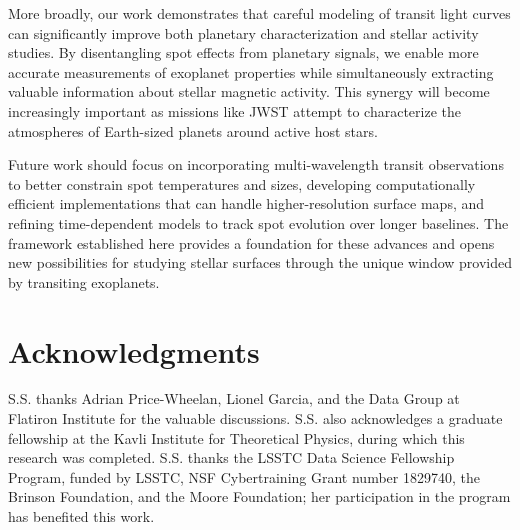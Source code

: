 \documentclass[twocolumn]{aastex631}
\begin{document}
More broadly, our work demonstrates that careful modeling of transit light curves can significantly improve both planetary characterization and stellar activity studies. 
By disentangling spot effects from planetary signals, we enable more accurate measurements of exoplanet properties while simultaneously extracting valuable information about stellar magnetic 
activity. This synergy will become increasingly important as missions like JWST attempt to characterize the atmospheres of Earth-sized planets around active host stars.

Future work should focus on incorporating multi-wavelength transit observations to better constrain spot temperatures and sizes, developing computationally efficient 
implementations that can handle higher-resolution surface maps, and refining time-dependent models to track spot evolution over longer baselines. 
The framework established here provides a foundation for these advances and opens new possibilities for studying stellar surfaces through 
the unique window provided by transiting exoplanets.

\section*{Acknowledgments}
S.S. thanks Adrian Price-Wheelan, Lionel Garcia, and the Data Group at Flatiron Institute for the valuable discussions. 
S.S. also acknowledges a graduate fellowship at the Kavli Institute for Theoretical Physics, 
during which this research was completed. S.S. thanks the LSSTC Data Science Fellowship Program, funded by LSSTC, 
NSF Cybertraining Grant number 1829740, the Brinson Foundation, and the Moore Foundation; her participation in the program has 
benefited this work.


\end{document}
